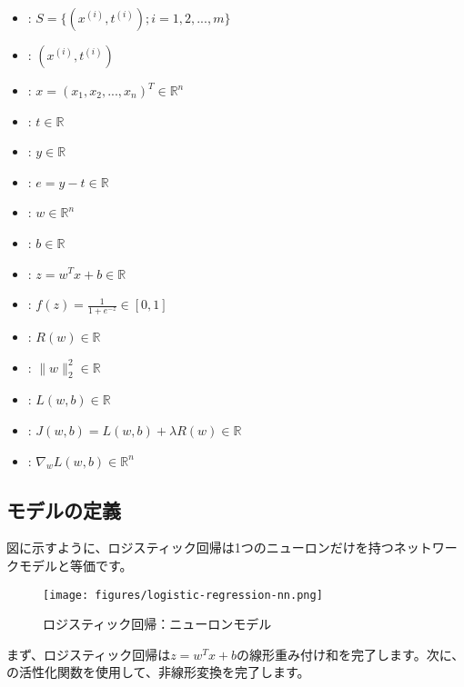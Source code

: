 \begin{content}
 \begin{itemize}
   \item {}: $ S = \{ ({x^{(i)}},{t^{(i)}});i = 1,2,...,m\} $
   \item {}: $ ({x^{(i)}},{t^{(i)}}) $
   \item {}: $ x = ({x_1},{x_2},...,{x_n})^{T}  \in {\mathbb{R}^n} $
   \item {}: $ t \in {\mathbb{R}} $
   \item {}: $ y \in {\mathbb{R}} $   
   \item {}: $ e = y - t \in {\mathbb{R}} $
   \item {}: $ w \in {\mathbb{R}^{n}} $   
   \item {}: $ b \in {\mathbb{R}} $
   \item {}: $ z = w^Tx + b \in {\mathbb{R}} $   
   \item {}: $ f(z) = \frac{1}{{1 + {e^{ - z}}}} \in {[0, 1]} $
   \item {}: $ R(w) \in {\mathbb{R}} $
   \item {}: $ \parallel w\parallel _2^2 \in {\mathbb{R}} $
   \item {}: $ L(w, b) \in {\mathbb{R}} $
   \item {}: $ J(w, b) = L(w, b) + \lambda R(w)\in {\mathbb{R}} $
   \item {}: $ {\nabla _w}L( {w,b}) \in {\mathbb{R}^n} $
 \end{itemize}

\subsection{モデルの定義}

図に示すように、ロジスティック回帰は1つのニューロンだけを持つネットワークモデルと等価です。

\begin{figure}[H]
\centering
\texttt{[image: figures/logistic-regression-nn.png]}
\caption{ロジスティック回帰：ニューロンモデル}
 \label{fig:logistic-regression-nn}
\end{figure}

まず、ロジスティック回帰は$z = {w^T}x + b$の線形重み付け和を完了します。次に、の活性化関数を使用して、非線形変換を完了します。


\end{content}
